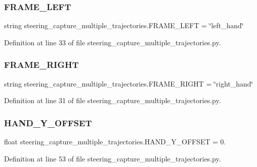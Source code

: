 \subsubsection{\texorpdfstring{FRAME\_LEFT}{FRAME\_LEFT}}
{\footnotesize\ttfamily string steering\+\_\+capture\+\_\+multiple\+\_\+trajectories.\+F\+R\+A\+M\+E\+\_\+\+L\+E\+FT = \char`\"{}left\+\_\+hand\char`\"{}}



Definition at line 33 of file steering\+\_\+capture\+\_\+multiple\+\_\+trajectories.\+py.

\mbox{\label{namespacesteering__capture__multiple__trajectories_a3bfc9a7fa847955d6d833a7745063fe5}} 
\subsubsection{\texorpdfstring{FRAME\_RIGHT}{FRAME\_RIGHT}}
{\footnotesize\ttfamily string steering\+\_\+capture\+\_\+multiple\+\_\+trajectories.\+F\+R\+A\+M\+E\+\_\+\+R\+I\+G\+HT = \char`\"{}right\+\_\+hand\char`\"{}}



Definition at line 31 of file steering\+\_\+capture\+\_\+multiple\+\_\+trajectories.\+py.

\mbox{\label{namespacesteering__capture__multiple__trajectories_a3933eb9e16f7a32da3622a7bc4bac011}} 
\subsubsection{\texorpdfstring{HAND\_Y\_OFFSET}{HAND\_Y\_OFFSET}}
{\footnotesize\ttfamily float steering\+\_\+capture\+\_\+multiple\+\_\+trajectories.\+H\+A\+N\+D\+\_\+\+Y\+\_\+\+O\+F\+F\+S\+ET = 0.}



Definition at line 53 of file steering\+\_\+capture\+\_\+multiple\+\_\+trajectories.\+py.

